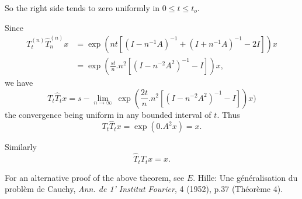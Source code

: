 So the right side tends to zero uniformly in $0 \le t \le t_o$.

Since 
\begin{align*}
 T^{(n)}_t \hat{T}_n^{(n)} x &= \exp \left(nt \left[(I-n^{-1}A)^{-1}+
  (I+n^{-1}A)^{-1}-2 I\right]\right)x \\ 
 &= \exp \left(\frac{st}{n}. n^2\left[(I- n^{-2} A^2)^{-1}
  -I\right]\right) x,
\end{align*}
we have
$$
T_t \hat{T}_t x= s-\lim_{n \to \infty} ~\exp ( \frac{2t}{n}. n^2[(I-
 n^{-2} A^2)^{-1} -I])x) 
$$
the convergence being uniform in any bounded interval of $t$. Thus 
$$
T_t \hat{T}_t x= \exp (0. A^2 x) =x.
$$ 

Similarly
$$
\hat{T}_t T_t x= x.
$$

\begin{remark*}%
 For an alternative proof of the above theorem, see $E$. Hille: Une
 g\'en\'eralisation du probl\`em de Cauchy, {\em Ann. de 1' Institut
  Fourier}, 4 (1952), p.37 (Th\'eor\`eme 4). 
\end{remark*}
